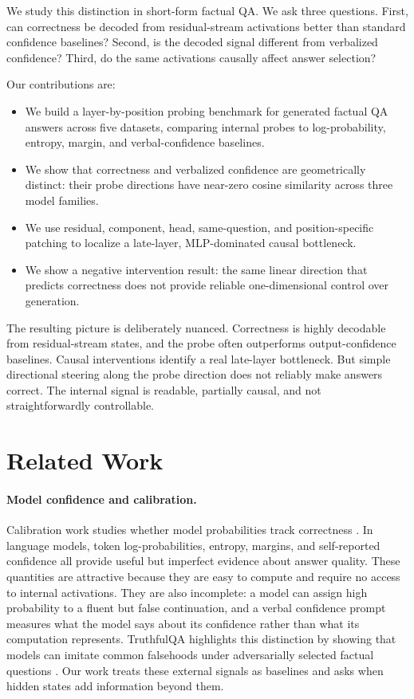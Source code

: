 \documentclass[11pt]{article}
\begin{document}
We study this distinction in short-form factual QA. We ask three questions. First,
can correctness be decoded from residual-stream activations better than standard
confidence baselines? Second, is the decoded signal different from verbalized
confidence? Third, do the same activations causally affect answer selection?

Our contributions are:
\begin{itemize}
    \item We build a layer-by-position probing benchmark for generated factual QA
    answers across five datasets, comparing internal probes to log-probability,
    entropy, margin, and verbal-confidence baselines.
    \item We show that correctness and verbalized confidence are geometrically
    distinct: their probe directions have near-zero cosine similarity across three
    model families.
    \item We use residual, component, head, same-question, and position-specific
    patching to localize a late-layer, MLP-dominated causal bottleneck.
    \item We show a negative intervention result: the same linear direction that
    predicts correctness does not provide reliable one-dimensional control over
    generation.
\end{itemize}

The resulting picture is deliberately nuanced. Correctness is highly decodable
from residual-stream states, and the probe often outperforms output-confidence
baselines. Causal interventions identify a real late-layer bottleneck. But simple
directional steering along the probe direction does not reliably make answers
correct. The internal signal is readable, partially causal, and not
straightforwardly controllable.

\section{Related Work}

\paragraph{Model confidence and calibration.}
Calibration work studies whether model probabilities track correctness
\citep{Guo2017Calibration,Kadavath2022LanguageKnow}. In language models, token
log-probabilities, entropy, margins, and self-reported confidence all provide
useful but imperfect evidence about answer quality. These quantities are attractive
because they are easy to compute and require no access to internal activations.
They are also incomplete: a model can assign high probability to a fluent but
false continuation, and a verbal confidence prompt measures what the model says
about its confidence rather than what its computation represents. TruthfulQA
highlights this distinction by showing that models can imitate common falsehoods
under adversarially selected factual questions \citep{Lin2022TruthfulQA:Falsehoods}.
Our work treats these external signals as baselines and asks when hidden states add
information beyond them.
\end{document}
